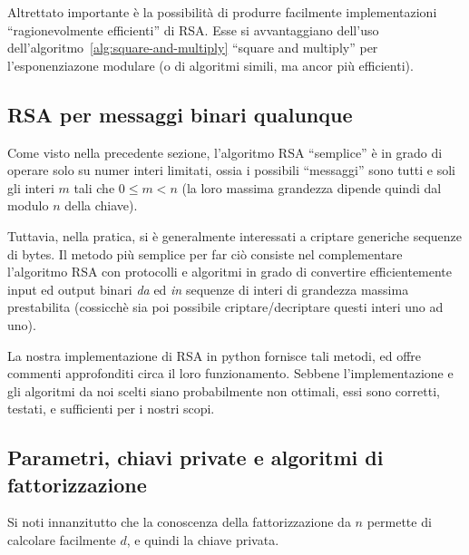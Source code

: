 \documentclass[pdflatex,11pt,a4paper,oneside]{article}
\let\OldEmph\emph
\renewcommand{\emph}[1]{\OldEmph{#1\/}}
\begin{document}
\medskip
Altrettato importante \`e la possibilit\`a di produrre facilmente
implementazioni ``ragionevolmente efficienti'' di RSA. Esse si
avvantaggiano dell'uso dell'algoritmo~\eqref{alg:square-and-multiply}
``square and multiply'' per l'esponenziazone modulare (o di algoritmi
simili, ma ancor pi\`u efficienti).

\subsection{RSA per messaggi binari qualunque}

Come visto nella precedente sezione, l'algoritmo RSA ``semplice'' \`e
in grado di operare solo su numer interi limitati, ossia i possibili
``messaggi'' sono tutti e soli gli interi $m$ tali che $0 \leq m < n$
(la loro massima grandezza dipende quindi dal modulo $n$ della chiave).

Tuttavia, nella pratica, si \`e generalmente interessati a criptare
generiche sequenze di bytes.  Il metodo pi\`u semplice per far ci\`o
consiste nel complementare l'algoritmo RSA con protocolli e algoritmi
in grado di convertire efficientemente input ed output binari \emph{da}
ed \emph{in} sequenze di interi di grandezza massima prestabilita
(cossicch\`e sia poi possibile criptare/decriptare questi interi uno
ad uno).

La nostra implementazione di RSA in python fornisce tali metodi, ed
offre commenti approfonditi circa il loro funzionamento. Sebbene
l'implementazione e gli algoritmi da noi scelti siano probabilmente
non ottimali, essi sono corretti, testati, e sufficienti per i nostri
scopi.

\subsection{Parametri, chiavi private e algoritmi di fattorizzazione}%
           \label{sect:keys-and-factorization}

Si noti innanzitutto che la conoscenza della fattorizzazione da $n$
permette di calcolare facilmente $d$, e quindi la chiave privata.
\end{document}
